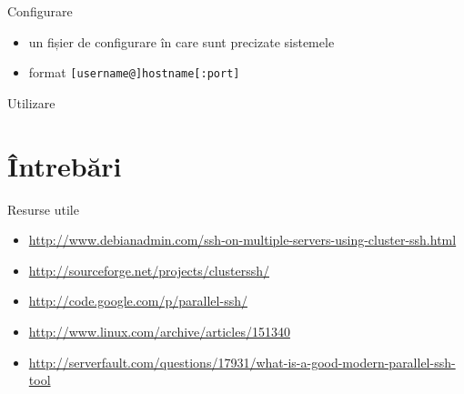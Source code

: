 \documentclass{beamer}
\begin{document}
\begin{frame}{Configurare}
	\begin{itemize}
		\item un fișier de configurare în care sunt precizate sistemele
		\item format \texttt{[username@]hostname[:port]}
	\end{itemize}
\end{frame}

\begin{frame}{Utilizare}
	
\end{frame}

\section{Întrebări}

\frame{\tableofcontents[currentsection]}

\begin{frame}{Resurse utile}
	\begin{itemize}
		\item
		\url{http://www.debianadmin.com/ssh-on-multiple-servers-using-cluster-ssh.html}
		\item \url{http://sourceforge.net/projects/clusterssh/}
		\item \url{http://code.google.com/p/parallel-ssh/}
		\item \url{http://www.linux.com/archive/articles/151340}
		\item
		\url{http://serverfault.com/questions/17931/what-is-a-good-modern-parallel-ssh-tool}
	\end{itemize}
\end{frame}
\end{document}
